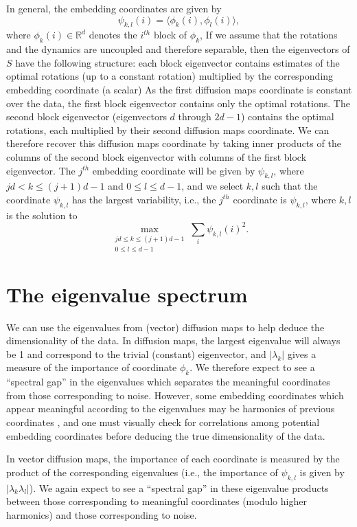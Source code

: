 In general, the embedding coordinates are given by
\begin{equation} \label{eq:vdm_coord}
\psi_{k,l} (i) = \langle \phi_k(i), \phi_l(i) \rangle,
\end{equation}
where $\phi_k(i) \in \mathbb{R}^d$ denotes the $i^{th}$ block of $\phi_k$,
%
If we assume that the rotations and the dynamics are uncoupled and therefore separable, then the eigenvectors of $S$ have the following structure: each block eigenvector contains estimates of the optimal rotations (up to a constant rotation) multiplied by the corresponding embedding coordinate (a scalar)
%
As the first diffusion maps coordinate is constant over the data, the first block eigenvector contains only the optimal rotations.
%
The second block eigenvector (eigenvectors $d$ through $2d-1$) contains the optimal rotations, each multiplied by their second diffusion maps coordinate.
%
We can therefore recover this diffusion maps coordinate by taking inner products of the columns of the second block eigenvector with columns of the first block eigenvector.
%
The $j^{th}$ embedding coordinate will be given by $\psi_{k,l}$, where $jd  < k \le (j+1)d-1$ and $0 \le l \le d-1$,
and we select $k, l$ such that the coordinate $\psi_{k, l}$ has the largest variability, i.e., the $j^{th}$ coordinate is $\psi_{k,l}$, where $k, l$ is the solution to
\begin{equation} \label{eq:first_embed_vdm}
\max_{
\begin{matrix}
jd  \le k \le (j+1)d-1 \\
0 \le l \le d-1
\end{matrix}}
 \sum_i \psi_{k,l} (i)^2. 
\end{equation}

\section{The eigenvalue spectrum}

We can use the eigenvalues from (vector) diffusion maps to help deduce the dimensionality of the data.
%
In diffusion maps, the largest eigenvalue will always be 1 and correspond to the trivial (constant) eigenvector, and $|\lambda_k|$ gives a measure of the importance of coordinate $\phi_k$. 
%
We therefore expect to see a ``spectral gap'' in the eigenvalues which separates the meaningful coordinates from those corresponding to noise.
%
However, some embedding coordinates which appear meaningful according to the eigenvalues may be harmonics of previous coordinates \citep{ferguson2010systematic}, 
and one must visually check for correlations among potential embedding coordinates before deducing the true dimensionality of the data. 

In vector diffusion maps, the importance of each coordinate is measured by the product of the corresponding eigenvalues (i.e., the importance of $\psi_{k,l}$ is given by $| \lambda_k \lambda_l |$). 
%
We again expect to see a ``spectral gap'' in these eigenvalue products between those corresponding to meaningful coordinates (modulo higher harmonics) and those corresponding to noise. 